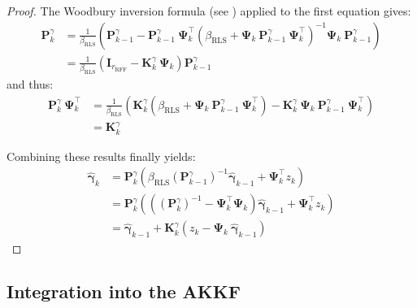\begin{proof}
	The Woodbury inversion formula (see ) applied to the first equation gives:
	\begin{equation}
		\begin{aligned}
		\mathbf{P}_k^\gamma&=\frac{1}{\beta_{\mathrm{RLS}}}\left(\mathbf{P}_{k-1}^\gamma-\mathbf{P}_{k-1}^\gamma\:\boldsymbol{\Psi}_k^\top\left(\beta_{\mathrm{RLS}}+\boldsymbol{\Psi}_k\:\mathbf{P}_{k-1}^\gamma\:\boldsymbol{\Psi}_k^\top\right)^{-1}\boldsymbol{\Psi}_k\:\mathbf{P}_{k-1}^\gamma\right)\\
		&=\frac{1}{\beta_{\mathrm{RLS}}}\left(\mathbf{I}_{r_{\mathrm{RFF}}}-\mathbf{K}_k^\gamma\:\boldsymbol{\Psi}_k\right)\mathbf{P}_{k-1}^\gamma
		\end{aligned}
	\end{equation}
	and thus:
	\begin{equation}
		\begin{aligned}
		\mathbf{P}_k^\gamma\:\boldsymbol{\Psi}_k^\top&=\frac{1}{\beta_{\mathrm{RLS}}}\left(\mathbf{K}_k^\gamma\left(\beta_{\mathrm{RLS}}+\boldsymbol{\Psi}_k\:\mathbf{P}_{k-1}^\gamma\:\boldsymbol{\Psi}_k^\top\right)-\mathbf{K}_k^\gamma\:\boldsymbol{\Psi}_k\:\mathbf{P}_{k-1}^\gamma\:\boldsymbol{\Psi}_k^\top\right)\\
		&=\mathbf{K}_k^\gamma
		\end{aligned}
	\end{equation}

	Combining these results finally yields:
	\begin{equation}
		\begin{aligned}
		\hat{\boldsymbol{\gamma}}_k&=\mathbf{P}_k^\gamma\left(\beta_{\mathrm{RLS}}\left(\mathbf{P}_{k-1}^\gamma\right)^{-1}\hat{\boldsymbol{\gamma}}_{k-1}+\boldsymbol{\Psi}_k^\top z_k\right)\\
		&=\mathbf{P}_k^\gamma\left(\left(\left(\mathbf{P}_k^\gamma\right)^{-1}-\boldsymbol{\Psi}_k^\top\boldsymbol{\Psi}_k\right)\hat{\boldsymbol{\gamma}}_{k-1}+\boldsymbol{\Psi}_k^\top z_k\right)\\
		&=\hat{\boldsymbol{\gamma}}_{k-1}+\mathbf{K}_k^\gamma\left(z_k-\boldsymbol{\Psi}_k\:\hat{\boldsymbol{\gamma}}_{k-1}\right)
		\end{aligned}
	\end{equation}
\end{proof}

\subsection{Integration into the AKKF}

